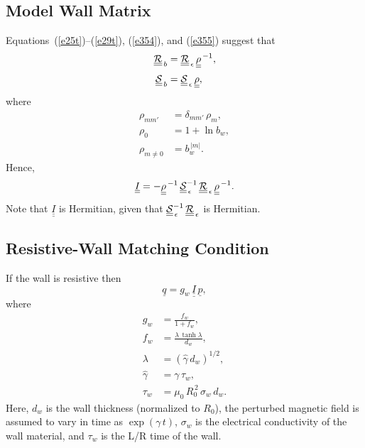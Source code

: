 \documentclass[12pt,prb,aps,notitlepage]{revtex4-1}
\begin{document}
\subsection{Model Wall Matrix}
 Equations~(\ref{e25t})--(\ref{e29t}), (\ref{e354}), and (\ref{e355}) suggest that
 \begin{align}
 \underline{\underline{{\cal R}}}_{\,b}& = \underline{\underline{{\cal R}}}_{\,\epsilon} \,\underline{\underline{\rho}}^{\,-1},\\[0.5ex]
 \underline{\underline{{\cal S}}}_{\,b} &= \underline{\underline{{\cal S}}}_{\,\epsilon} \,\underline{\underline{\rho}},
 \end{align}
 where
 \begin{align}
 \rho_{mm'} &= \delta_{mm'}\,\rho_m,\\[0.5ex]
 \rho_0 &= 1+\ln b_w,\\[0.5ex]
 \rho_{m\neq 0} &= b_w^{\,|m|}.
 \end{align}
 Hence,
 \begin{equation}
 \underline{\underline{I}} = - \underline{\underline{\rho}}^{\,-1}\,\underline{\underline{\cal S}}_{\,\epsilon}^{-1}\,\underline{\underline{\cal R}}_{\,\epsilon}\,\underline{\underline{\rho}}^{\,-1}.
 \end{equation}
 Note that $\underline{\underline{I}}$ is Hermitian, given that $\underline{\underline{\cal S}}_{\,\epsilon}^{-1}\,\underline{\underline{\cal R}}_{\,\epsilon}$
 is Hermitian. 
 
\subsection{Resistive-Wall Matching Condition}
 If the wall is resistive then  
 \begin{equation}\label{e55}
\underline{q} =g_w\,\underline{\underline{I}} \,\underline{p},
\end{equation}
where
\begin{align}
g_w &= \frac{f_w}{1+f_w},\\[0.5ex]
f_w &= \frac{\lambda\,\tanh\lambda}{d_w},\\[0.5ex]
\lambda &= (\hat{\gamma}\,d_w)^{1/2},\\[0.5ex]
\hat{\gamma}&= \gamma\,\tau_w,\\[0.5ex]
\tau_w&= \mu_0\,R_0^{\,2}\,\sigma_w\,d_w.
\end{align}
Here, $d_w$ is the wall thickness (normalized to $R_0$), the perturbed magnetic field is assumed to vary in time as $\exp(\gamma\,t)$, $\sigma_w$
is the electrical conductivity of the wall material, and $\tau_w$ is the L/R time of the wall. 
\end{document}
